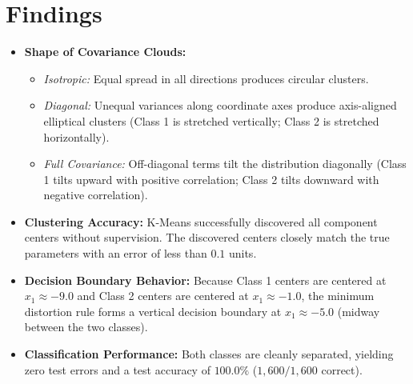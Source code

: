 \documentclass[11pt,a4paper]{article}
\begin{document}
\section{Findings}
\begin{itemize}
  \item \textbf{Shape of Covariance Clouds:}
  \begin{itemize}
    \item \textit{Isotropic:} Equal spread in all directions produces circular clusters.
    \item \textit{Diagonal:} Unequal variances along coordinate axes produce axis-aligned elliptical clusters (Class 1 is stretched vertically; Class 2 is stretched horizontally).
    \item \textit{Full Covariance:} Off-diagonal terms tilt the distribution diagonally (Class 1 tilts upward with positive correlation; Class 2 tilts downward with negative correlation).
  \end{itemize}

  \item \textbf{Clustering Accuracy:}
  K-Means successfully discovered all component centers without supervision. The discovered centers closely match the true parameters with an error of less than $0.1$ units.

  \item \textbf{Decision Boundary Behavior:}
  Because Class 1 centers are centered at $x_1 \approx -9.0$ and Class 2 centers are centered at $x_1 \approx -1.0$, the minimum distortion rule forms a vertical decision boundary at $x_1 \approx -5.0$ (midway between the two classes).

  \item \textbf{Classification Performance:}
  Both classes are cleanly separated, yielding zero test errors and a test accuracy of $100.0\%$ ($1,600 / 1,600$ correct).
\end{itemize}
\end{document}
